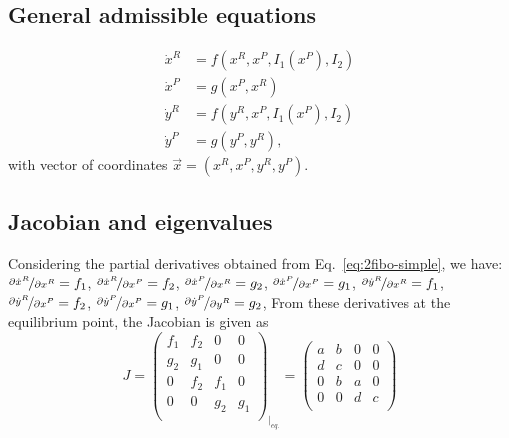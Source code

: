 \documentclass[12pt]{article}
\begin{document}
\subsection{General admissible equations}
\begin{equation} \label{eq:2fibo-simple}
    \begin{aligned}
        \dot{x}^R &= f(x^R, x^P, I_1(x^P), I_2)\\
        \dot{x}^P &= g(x^P, x^R)\\
        \dot{y}^R &= f(y^R, x^P, I_1(x^P), I_2)\\
        \dot{y}^P &= g(y^P, y^R),
    \end{aligned}
\end{equation}
with vector of coordinates $\vec{x} = (x^R, x^P, y^R, y^P)$.

\subsection{Jacobian and eigenvalues}

Considering the partial derivatives obtained from 
Eq.~\ref{eq:2fibo-simple}, we have:
$\nicefrac{\partial \dot{x}^R}{\partial {x}^R} = f_1$,
$\nicefrac{\partial \dot{x}^R}{\partial {x}^P} = f_2$,
$\nicefrac{\partial \dot{x}^P}{\partial {x}^R} = g_2$,
$\nicefrac{\partial \dot{x}^P}{\partial {x}^P} = g_1$,
$\nicefrac{\partial \dot{y}^R}{\partial {x}^R} = f_1$,
$\nicefrac{\partial \dot{y}^R}{\partial {x}^P} = f_2$,
$\nicefrac{\partial \dot{y}^P}{\partial {x}^P} = g_1$,
$\nicefrac{\partial \dot{y}^P}{\partial {y}^R} = g_2$,
From these derivatives at the equilibrium point, the 
Jacobian is given as
\begin{equation}
    J = \begin{pmatrix}
        f_1 & f_2 & 0 & 0 \\
        g_2 & g_1 & 0 & 0 \\
        0 & f_2 & f_1 & 0 \\
        0 & 0 & g_2 & g_1 \\
    \end{pmatrix}_{\big|_{eq.}} =
    \begin{pmatrix}
        a & b & 0 & 0 \\
        d & c & 0 & 0 \\
        0 & b & a & 0 \\
        0 & 0 & d & c \\ 
    \end{pmatrix}
\end{equation}
\end{document}

